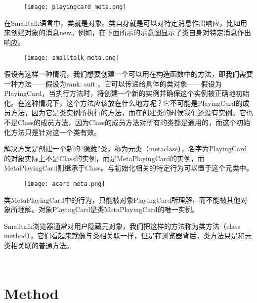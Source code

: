 \begin{figure}[htbp]
\centering
\texttt{[image: playingcard\_meta.png]}
\label{fig:playingcard_meta}
\end{figure}


在Smalltalk语言中，类就是对象。类自身就是可以对特定消息作出响应，比如用来创建对象的消息new。例如，在下面所示的示意图显示了类自身对特定消息作出响应。


\begin{figure}[htbp]
\centering
\texttt{[image: smalltalk\_meta.png]}
\label{fig:smalltalk_meta}
\end{figure}

假设有这样一种情况，我们想要创建一个可以用在构造函数中的方法，即我们需要一种方法——假设为rank: suit:，它可以传递给具体的类对象——假设为PlayingCard，当执行方法时，将创建一个新的实例并确保这个实例被正确地初始化。在这种情况下，这个方法应该放在什么地方呢？它不可能是PlayingCard的成员方法，因为它是类实例所执行的方法，而在创建类的时候我们还没有实例。它也不是Class的成员方法，因为Class的成员方法对所有的类都是通用的，而这个初始化方法只是针对这一个类有效。

解决方案是创建一个新的“隐藏”类，称为元类（metaclass），名字为PlayingCard的对象实际上不是Class的实例，而是MetaPlayingCard的实例，而MetaPlayingCard则继承于Class。与初始化相关的特定行为可以置于这个元类中。


\begin{figure}[htbp]
\centering
\texttt{[image: acard\_meta.png]}
\label{fig:acard_meta}
\end{figure}

类MetaPlayingCard中的行为，只能被对象PlayingCard所理解，而不能被其他对象所理解。对象PlayingCard是类MetaPlayingCard的唯一实例。

Smalltalk浏览器通常对用户隐藏元对象，我们把这样的方法称为类方法（class method），它们看起来就像与类相关联一样，但是在浏览器背后，类方法只是和元类相关联的普通方法。


\begin{lstlisting}[language=C++]

\end{lstlisting}





\begin{lstlisting}[language=C++]

\end{lstlisting}




\chapter{Method}



